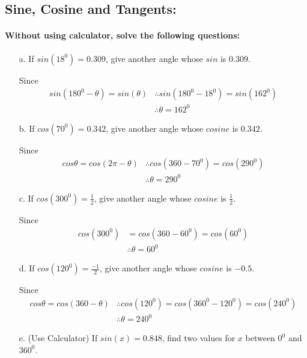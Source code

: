 \documentclass{article}
\begin{document}
\subsection{Sine, Cosine and Tangents:}
\paragraph{Without using calculator, solve the following questions:}
\begin{enumerate}
  \item[a.] If $sin(18^{0})= 0.309$, give another angle whose $sin$ is $0.309$.
        
        Since
        \[
        \begin{aligned}
          sin(180^0-\theta) = sin(\theta)
          &\therefore sin(180^{0}-18^{0}) = sin(162^{0}) \\
          &\therefore \theta = 162^{0}
        \end{aligned}
        \]

  \item[b.] If $cos(70^{0})= 0.342$, give another angle whose $cosine$ is $0.342$.

        Since
        \[
        \begin{aligned}
          cos\theta = cos(2\pi - \theta)
          &\therefore cos(360-70^{0}) = cos(290^{0}) \\
          &\therefore \theta = 290^{0}
        \end{aligned}
        \]

  \item[c.] If $cos(300^{0})= \frac{1}{2}$, give another angle whose $cosine$ is $\frac{1}{2}$.

        Since
        \[
        \begin{aligned}
          cos(300^{0}) &= cos(360-60^{0}) = cos(60^{0}) \\
                       &\therefore \theta = 60^{0}
        \end{aligned}
        \]
  \item[d.] If $cos(120^{0})= \frac{-1}{2}$, give another angle whose $cosine$ is $-0.5$.

        Since
        \[
        \begin{aligned}
          cos\theta = cos(360-\theta)
          &\therefore cos(120^{0}) = cos(360^{0} - 120^{0}) = cos(240^{0}) \\
          &\therefore \theta = 240^{0}
        \end{aligned}
        \]
  \item[e.] (Use Calculator) If $sin(x)= 0.848$, find two values for $x$ between $0^{0}$ and $360^{0}$.


\end{enumerate}
\end{document}

